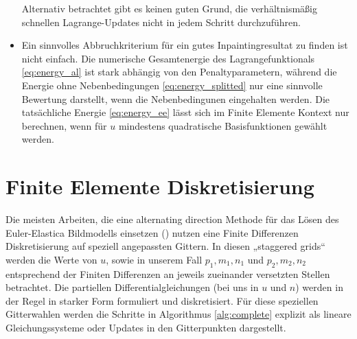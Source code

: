 \documentclass{mythesis}
\begin{document}
\begin{algorithm}
\begin{note}
\begin{itemize}
		Alternativ betrachtet gibt es keinen guten Grund, die verhältnismäßig schnellen Lagrange-Updates nicht in jedem Schritt durchzuführen.
	    \item %
		Ein sinnvolles Abbruchkriterium für ein gutes Inpaintingresultat zu finden ist nicht einfach.
		Die numerische Gesamtenergie des Lagrangefunktionals \eqref{eq:energy_al} ist stark abhängig von den Penaltyparametern, während die Energie ohne Nebenbedingungen \eqref{eq:energy_splitted} nur eine sinnvolle Bewertung darstellt, wenn die Nebenbedingunen eingehalten werden.
		Die tatsächliche Energie \eqref{eq:energy_ee} lässt sich im Finite Elemente Kontext nur berechnen, wenn für $u$ mindestens quadratische Basisfunktionen gewählt werden.

	\end{itemize}
    \end{note}
\end{algorithm}


\section{Finite Elemente Diskretisierung}


Die meisten Arbeiten, die eine alternating direction Methode für das Lösen des Euler-Elastica Bildmodells einsetzen (\cite{??}) nutzen eine Finite Differenzen Diskretisierung auf speziell angepassten Gittern.
In diesen „staggered grids“ werden die Werte von $u$, sowie in unserem Fall $p_1, m_1, n_1$ und $p_2, m_2, n_2$ entsprechend der Finiten Differenzen an jeweils zueinander versetzten Stellen betrachtet.
Die partiellen Differentialgleichungen (bei uns in $u$ und $n$) werden in der Regel in starker Form formuliert und diskretisiert.
Für diese speziellen Gitterwahlen werden die Schritte in Algorithmus \ref{alg:complete} explizit als lineare Gleichungssysteme oder Updates in den Gitterpunkten dargestellt.
\end{document}
